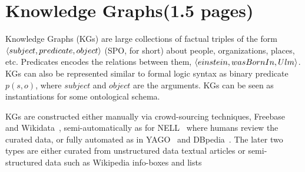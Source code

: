 \section{Knowledge Graphs(1.5 pages)}
\label{sec:kgs}

Knowledge Graphs (KGs) are large collections of factual triples of the form $\langle subject, predicate,object\rangle$ (SPO, for short) about people, organizations, places, etc. Predicates encodes the relations between them, \eg $\langle einstein, wasBornIn, Ulm\rangle$. KGs can also be represented similar to formal logic syntax as binary predicate $p(s,o)$, where $subject$ and $object$ are the arguments. KGs can be seen as instantiations for some ontological schema.  

 KGs are constructed either manually via crowd-sourcing techniques, \eg Freebase~\cite{Freebase} and Wikidata~\cite{wikidata}, semi-automatically as for NELL~\cite{NELL-aaai15} where humans review the curated data, or fully automated as in YAGO~\cite{yago} and DBpedia~\cite{dbpedia}. The later two types are either curated from unstructured data \eg textual articles or semi-structured data such as Wikipedia info-boxes and lists~\cite{yago,dbpedia}



